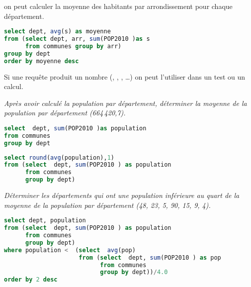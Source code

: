 on peut calculer la moyenne des habitants par arrondissement pour chaque département.

\begin{lstlisting}[language=SQL]
select dept, avg(s) as moyenne
from (select dept, arr, sum(POP2010 )as s
      from communes group by arr)
group by dept
order by moyenne desc
\end{lstlisting}


Si une requête produit un nombre (, , , \dots) on peut l'utiliser dans un test ou un calcul.
\begin{Exercise}
\it Après avoir calculé la population par département, déterminer la moyenne de la population par département (664\,420,7).
\end{Exercise}
\begin{Answer}
\begin{lstlisting}[language=SQL]
select  dept, sum(POP2010 )as population
from communes
group by dept
\end{lstlisting}
\begin{lstlisting}[language=SQL]
select round(avg(population),1)
from (select  dept, sum(POP2010 ) as population
      from communes
      group by dept)
\end{lstlisting}
\end{Answer}
\begin{Exercise}
\it Déterminer les départements qui ont une population inférieure au quart de la moyenne de la population par département (48, 23, 5, 90, 15, 9, 4).
\end{Exercise}
\begin{Answer}
\begin{lstlisting}[language=SQL]
select dept, population
from (select  dept, sum(POP2010 ) as population 
      from communes 
      group by dept)
where population <  (select  avg(pop) 
                     from (select  dept, sum(POP2010 ) as pop
                           from communes
                           group by dept))/4.0
order by 2 desc
\end{lstlisting}
\newpage
\end{Answer}
